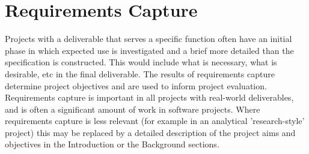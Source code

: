 \section{Requirements Capture}
Projects with a deliverable that serves a specific
function often have an initial phase in which expected
use is investigated and a brief more detailed than the
specification is constructed. This would include what
is necessary, what is desirable, etc in the final
deliverable. The results of requirements capture
determine project objectives and are used to inform
project evaluation.\\ \newline \noindent Requirements capture is important in all projects with
real-world deliverables, and is often a significant
amount of work in software projects. Where
requirements capture is less relevant (for example in
an analytical 'research-style' project) this may be
replaced by a detailed description of the project aims
and objectives in the Introduction or the Background
sections.
